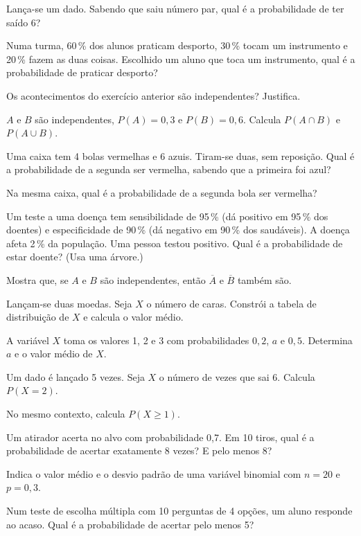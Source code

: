 \documentclass[12pt]{article}
\begin{document}
\begin{exercicios}
  \item Lança-se um dado. Sabendo que saiu número par, qual é a probabilidade de ter saído 6?
  \item Numa turma, 60\,\% dos alunos praticam desporto, 30\,\% tocam um instrumento e 20\,\% fazem as duas coisas. Escolhido um aluno que toca um instrumento, qual é a probabilidade de praticar desporto?
  \item Os acontecimentos do exercício anterior são independentes? Justifica.
  \item $A$ e $B$ são independentes, $P(A) = 0{,}3$ e $P(B) = 0{,}6$. Calcula $P(A \cap B)$ e $P(A \cup B)$.
  \item Uma caixa tem 4 bolas vermelhas e 6 azuis. Tiram-se duas, sem reposição. Qual é a probabilidade de a segunda ser vermelha, sabendo que a primeira foi azul?
  \item Na mesma caixa, qual é a probabilidade de a segunda bola ser vermelha?
  \item Um teste a uma doença tem sensibilidade de 95\,\% (dá positivo em 95\,\% dos doentes) e especificidade de 90\,\% (dá negativo em 90\,\% dos saudáveis). A doença afeta 2\,\% da população. Uma pessoa testou positivo. Qual é a probabilidade de estar doente? (Usa uma árvore.)
  \item Mostra que, se $A$ e $B$ são independentes, então $\overline{A}$ e $\overline{B}$ também são.
\end{exercicios}

\begin{exercicios}
  \item Lançam-se duas moedas. Seja $X$ o número de caras. Constrói a tabela de distribuição de $X$ e calcula o valor médio.
  \item A variável $X$ toma os valores 1, 2 e 3 com probabilidades $0{,}2$, $a$ e $0{,}5$. Determina $a$ e o valor médio de $X$.
  \item Um dado é lançado 5 vezes. Seja $X$ o número de vezes que sai 6. Calcula $P(X = 2)$.
  \item No mesmo contexto, calcula $P(X \ge 1)$.
  \item Um atirador acerta no alvo com probabilidade 0,7. Em 10 tiros, qual é a probabilidade de acertar exatamente 8 vezes? E pelo menos 8?
  \item Indica o valor médio e o desvio padrão de uma variável binomial com $n = 20$ e $p = 0{,}3$.
  \item Num teste de escolha múltipla com 10 perguntas de 4 opções, um aluno responde ao acaso. Qual é a probabilidade de acertar pelo menos 5?
\end{exercicios}
\end{document}
